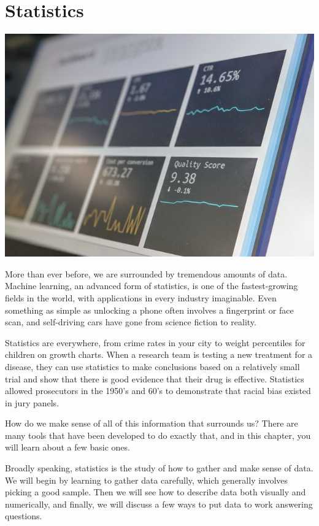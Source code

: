 \documentclass[9pt,letter,twoside,openright]{memoir}
\begin{document}
\chapter{Statistics}
\begin{center}\includegraphics[width=\textwidth]{lineGraphsOnScreen}\end{center}

More than ever before, we are surrounded by tremendous amounts of data.  Machine learning, an advanced form of statistics, is one of the fastest-growing fields in the world, with applications in every industry imaginable.  Even something as simple as unlocking a phone often involves a fingerprint or face scan, and self-driving cars have gone from science fiction to reality.

Statistics are everywhere, from crime rates in your city to weight percentiles for children on growth charts. When a research team is testing a new treatment for a disease, they can use statistics to make conclusions based on a relatively small trial and show that there is good evidence that their drug is effective. Statistics allowed prosecutors in the 1950's 
and 60's to demonstrate that racial bias existed in jury panels.

How do we make sense of all of this information that surrounds us?  There are many tools that have been developed to do exactly that, and in this chapter, you will learn about a few basic ones.

Broadly speaking, statistics is the study of how to gather and make sense of data.  We will begin by learning to gather data carefully, which generally involves picking a good sample.  Then we will see how to describe data both visually and numerically, and finally, we will discuss a few ways to put data to work answering questions.
\vfill
\pagebreak
\end{document}
